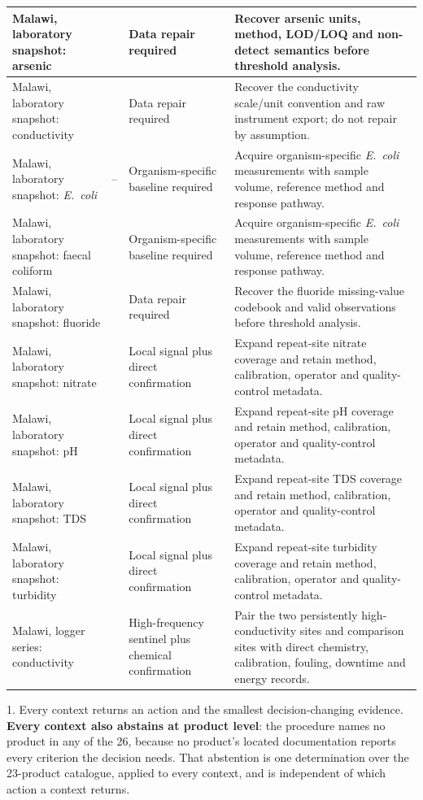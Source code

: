 \documentclass[10pt,letterpaper]{article}
\begin{document}
{\begin{longtable}{>{\raggedright\arraybackslash}p{1.55in}>{\raggedleft\arraybackslash}p{0.5in}>{\raggedright\arraybackslash}p{1.35in}>{\raggedright\arraybackslash}p{2.77in}}
Malawi, laboratory snapshot: arsenic & 10 & Data repair required & Recover arsenic units, method, LOD/LOQ and non-detect semantics before threshold analysis. \\ \hline
Malawi, laboratory snapshot: conductivity & 31 & Data repair required & Recover the conductivity scale/unit convention and raw instrument export; do not repair by assumption. \\ \hline
Malawi, laboratory snapshot: \textit{E.~coli} & -- & Organism-specific baseline required & Acquire organism-specific \textit{E.~coli} measurements with sample volume, reference method and response pathway. \\ \hline
Malawi, laboratory snapshot: faecal coliform & 19 & Organism-specific baseline required & Acquire organism-specific \textit{E.~coli} measurements with sample volume, reference method and response pathway. \\ \hline
Malawi, laboratory snapshot: fluoride & 2 & Data repair required & Recover the fluoride missing-value codebook and valid observations before threshold analysis. \\ \hline
Malawi, laboratory snapshot: nitrate & 31 & Local signal plus direct confirmation & Expand repeat-site nitrate coverage and retain method, calibration, operator and quality-control metadata. \\ \hline
Malawi, laboratory snapshot: pH & 31 & Local signal plus direct confirmation & Expand repeat-site pH coverage and retain method, calibration, operator and quality-control metadata. \\ \hline
Malawi, laboratory snapshot: TDS & 31 & Local signal plus direct confirmation & Expand repeat-site TDS coverage and retain method, calibration, operator and quality-control metadata. \\ \hline
Malawi, laboratory snapshot: turbidity & 22 & Local signal plus direct confirmation & Expand repeat-site turbidity coverage and retain method, calibration, operator and quality-control metadata. \\ \hline
Malawi, logger series: conductivity & 714 & High-frequency sentinel plus chemical confirmation & Pair the two persistently high-conductivity sites and comparison sites with direct chemistry, calibration, fouling, downtime and energy records. \\ \hline
\end{longtable}
\begin{flushleft}
1. Every context returns an action and the smallest decision-changing evidence. \textbf{Every context also abstains at product level}: the procedure names no product in any of the 26, because no product's located documentation reports every criterion the decision needs. That abstention is one determination over the 23-product catalogue, applied to every context, and is independent of which action a context returns.


\end{flushleft}}
\end{document}
